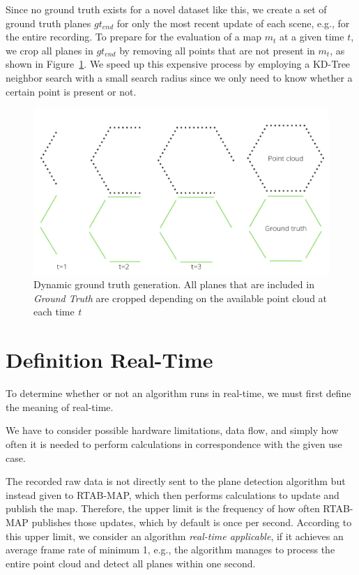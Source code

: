 \documentclass[main.tex]{subfiles}
\begin{document}
Since no ground truth exists for a novel dataset like this, we create a set of ground truth planes $gt_{end}$ for only the most recent update of each scene, e.g., for the entire recording.
To prepare for the evaluation of a map $m_t$ at a given time $t$, we crop all planes in $gt_{end}$ by removing all points that are not present in $m_t$, as shown in
Figure~\ref{fig:dynGT}.
We speed up this expensive process by employing a KD-Tree neighbor search with a small search radius since we only need to know whether a certain point is present or not.
\begin{figure}[H]
    \centering
    \includegraphics[width=15 cm]{images/dynamic_eval.png}
    \caption[Dynamic Ground Truth Generation]{Dynamic ground truth generation. All planes that are included in \textit{Ground Truth} are cropped depending on
        the available point cloud at each time \textit{t} }
    \label{fig:dynGT}
\end{figure}


\section{Definition Real-Time}\label{sec:realtime}
To determine whether or not an algorithm runs in real-time, we must first define the meaning of real-time.

We have to consider possible hardware limitations, data flow, and simply
how often it is needed to perform calculations in correspondence with the given use case.

The recorded raw data is not directly sent to the plane detection algorithm but instead given to RTAB-MAP, which then performs
calculations to update and publish the map.
Therefore, the upper limit is the frequency of how often RTAB-MAP publishes those updates, which by default is once per second.
According to this upper limit, we consider an algorithm \textit{real-time applicable}, if it achieves an average frame
rate of minimum 1, e.g., the algorithm manages to process the entire point cloud and detect all planes within one second.
\end{document}
